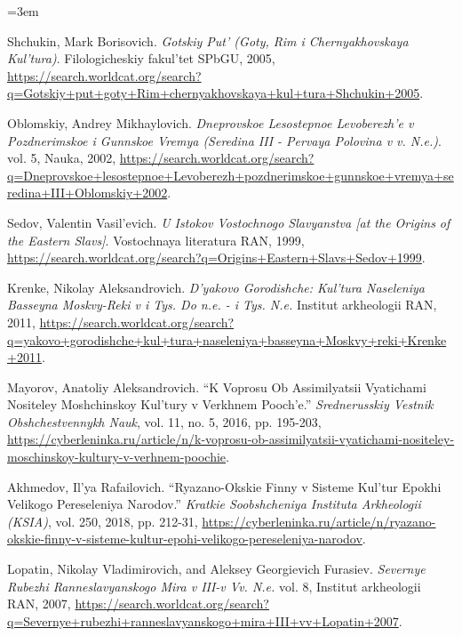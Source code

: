 \IfFileExists{../../_shared/template/intellte.cls}{\documentclass[10pt,onecolumn]{../../_shared/template/intellte}}{\documentclass[10pt,onecolumn]{intellte}}
\newlength{\csllabelwidth}
\newenvironment{CSLReferences}[2]
 {\par\vspace{2pt}%
  \begin{list}{}{%
  \normalfont\rmfamily\mdseries\fontsize{10pt}{15pt}\selectfont\raggedright
  \hyphenpenalty=50\exhyphenpenalty=50\emergencystretch=3em%
  \renewcommand{\bibitem}[2][]{\item\hypertarget{##2}{}}%
  \setlength{\lineskiplimit}{-6pt}%
  \setlength{\leftmargin}{\csllabelwidth}%
  \setlength{\itemindent}{-\csllabelwidth}%
  \setlength{\labelwidth}{\csllabelwidth}%
  \setlength{\labelsep}{0pt}%
  \setlength{\parsep}{0pt}%
  \setlength{\topsep}{0pt}%
  \setlength{\partopsep}{0pt}%
  \setlength{\itemsep}{2pt}}}
 {\end{list}}
\newcommand{\CSLLeftMargin}[1]{\makebox[\csllabelwidth][l]{\normalfont\rmfamily\mdseries\fontsize{10pt}{15pt}\selectfont #1}}
\newcommand{\CSLRightInline}[1]{\normalfont\rmfamily\mdseries\fontsize{10pt}{15pt}\selectfont #1}
\begin{document}
\begin{CSLReferences}{0}{0}
\CSLLeftMargin{6. }%
\CSLRightInline{Shchukin, Mark Borisovich. \emph{Gotskiy Put' (Goty, Rim
i Chernyakhovskaya Kul'tura)}. Filologicheskiy fakul'tet SPbGU, 2005,
\url{https://search.worldcat.org/search?q=Gotskiy+put+goty+Rim+chernyakhovskaya+kul+tura+Shchukin+2005}.}

\CSLLeftMargin{7. }%
\CSLRightInline{Oblomskiy, Andrey Mikhaylovich. \emph{Dneprovskoe
Lesostepnoe Levoberezh'e v Pozdnerimskoe i Gunnskoe Vremya (Seredina III
- Pervaya Polovina v v. N.e.)}. vol. 5, Nauka, 2002,
\url{https://search.worldcat.org/search?q=Dneprovskoe+lesostepnoe+Levoberezh+pozdnerimskoe+gunnskoe+vremya+seredina+III+Oblomskiy+2002}.}

\CSLLeftMargin{8. }%
\CSLRightInline{Sedov, Valentin Vasil'evich. \emph{U Istokov Vostochnogo
Slavyanstva {[}at the Origins of the Eastern Slavs{]}}. Vostochnaya
literatura RAN, 1999,
\url{https://search.worldcat.org/search?q=Origins+Eastern+Slavs+Sedov+1999}.}

\CSLLeftMargin{9. }%
\CSLRightInline{Krenke, Nikolay Aleksandrovich. \emph{D'yakovo
Gorodishche: Kul'tura Naseleniya Basseyna Moskvy-Reki v i Tys. Do n.e. -
i Tys. N.e.} Institut arkheologii RAN, 2011,
\url{https://search.worldcat.org/search?q=yakovo+gorodishche+kul+tura+naseleniya+basseyna+Moskvy+reki+Krenke+2011}.}

\CSLLeftMargin{10. }%
\CSLRightInline{Mayorov, Anatoliy Aleksandrovich. {``K Voprosu Ob
Assimilyatsii Vyatichami Nositeley Moshchinskoy Kul'tury v Verkhnem
Pooch'e.''} \emph{Srednerusskiy Vestnik Obshchestvennykh Nauk}, vol. 11,
no. 5, 2016, pp. 195-203,
\url{https://cyberleninka.ru/article/n/k-voprosu-ob-assimilyatsii-vyatichami-nositeley-moschinskoy-kultury-v-verhnem-poochie}.}

\CSLLeftMargin{11. }%
\CSLRightInline{Akhmedov, Il'ya Rafailovich. {``Ryazano-Okskie Finny v
Sisteme Kul'tur Epokhi Velikogo Pereseleniya Narodov.''} \emph{Kratkie
Soobshcheniya Instituta Arkheologii (KSIA)}, vol. 250, 2018, pp. 212-31,
\url{https://cyberleninka.ru/article/n/ryazano-okskie-finny-v-sisteme-kultur-epohi-velikogo-pereseleniya-narodov}.}

\CSLLeftMargin{12. }%
\CSLRightInline{Lopatin, Nikolay Vladimirovich, and Aleksey Georgievich
Furasiev. \emph{Severnye Rubezhi Ranneslavyanskogo Mira v III-v Vv.
N.e.} vol. 8, Institut arkheologii RAN, 2007,
\url{https://search.worldcat.org/search?q=Severnye+rubezhi+ranneslavyanskogo+mira+III+vv+Lopatin+2007}.}


\end{CSLReferences}
\end{document}
